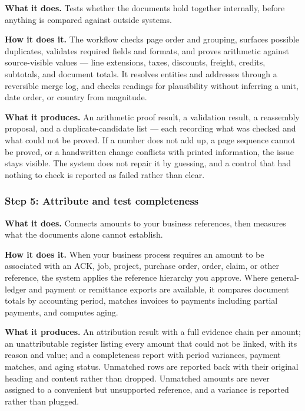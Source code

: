 \documentclass[
]{article}
\begin{document}
\textbf{What it does.} Tests whether the documents hold together
internally, before anything is compared against outside systems.

\textbf{How it does it.} The workflow checks page order and grouping,
surfaces possible duplicates, validates required fields and formats, and
proves arithmetic against source-visible values --- line extensions,
taxes, discounts, freight, credits, subtotals, and document totals. It
resolves entities and addresses through a reversible merge log, and
checks readings for plausibility without inferring a unit, date order,
or country from magnitude.

\textbf{What it produces.} An arithmetic proof result, a validation
result, a reassembly proposal, and a duplicate-candidate list --- each
recording what was checked and what could not be proved. If a number
does not add up, a page sequence cannot be proved, or a handwritten
change conflicts with printed information, the issue stays visible. The
system does not repair it by guessing, and a control that had nothing to
check is reported as failed rather than clear.

\subsubsection{Step 5: Attribute and test
completeness}\label{step-5-attribute-and-test-completeness}

\textbf{What it does.} Connects amounts to your business references,
then measures what the documents alone cannot establish.

\textbf{How it does it.} When your business process requires an amount
to be associated with an ACK, job, project, purchase order, order,
claim, or other reference, the system applies the reference hierarchy
you approve. Where general-ledger and payment or remittance exports are
available, it compares document totals by accounting period, matches
invoices to payments including partial payments, and computes aging.

\textbf{What it produces.} An attribution result with a full evidence
chain per amount; an unattributable register listing every amount that
could not be linked, with its reason and value; and a completeness
report with period variances, payment matches, and aging status.
Unmatched rows are reported back with their original heading and content
rather than dropped. Unmatched amounts are never assigned to a
convenient but unsupported reference, and a variance is reported rather
than plugged.
\end{document}
